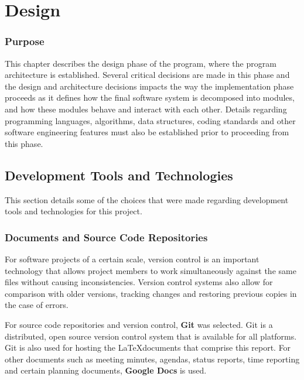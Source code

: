  

\chapter{Design}
\label{design}

\minitoc

\subsection*{Purpose}
This chapter describes the design phase of the program, where the program architecture is established. Several critical decisions are made in this phase and the design and architecture decisions impacts the way the implementation phase proceeds as it defines how the final software system is decomposed into modules, and how these modules behave and interact with each other. Details regarding programming languages, algorithms, data structures, coding standards and other software engineering features must also be established prior to proceeding from this phase.

\section{Development Tools and Technologies}\label{DevTools}
This section details some of the choices that were made regarding development tools and technologies for this project.

\subsection{Documents and Source Code Repositories}
For software projects of a certain scale, version control is an important technology that allows project members to work simultaneously against the same files without causing inconsistencies. Version control systems also allow for comparison with older versions, tracking changes and restoring previous copies in the case of errors.

For source code repositories and version control, \textbf{Git} was selected. Git is a distributed, open source version control system that is available for all platforms. Git is also used for hosting the \LaTeX documents that comprise this report. For other documents such as meeting minutes, agendas, status reports, time reporting and certain planning documents, \textbf{Google Docs} is used.


